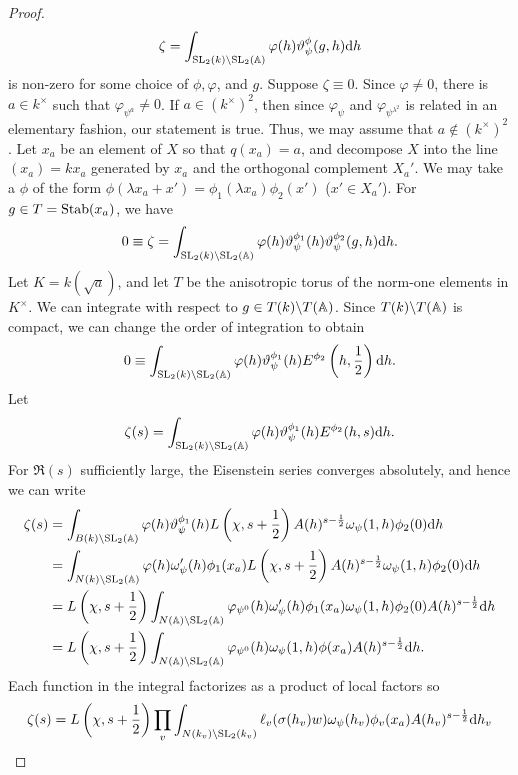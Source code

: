 \begin{proof}
\[
\zeta = \int_{\mathrm{SL}_2(k) \backslash \mathrm{SL}_2(\mathbb{A})} \varphi(h) \vartheta_\psi^\phi(g, h) \mathrm{d} h
\]
is non-zero for some choice of $\phi, \varphi$, and $g$.
Suppose $\zeta \equiv 0$.
Since $\varphi \neq 0$, there is $a \in k^\times$ such that $\varphi_{\psi^a} \neq 0$.
If $a \in (k^\times)^2$, then since $\varphi_{\psi}$ and $\varphi_{\psi^{\lambda^2}}$ is related in an elementary fashion, our statement is true.
Thus, we may assume that $a \not\in (k^\times)^2$.
Let $x_a$ be an element of $X$ so that $q(x_a) = a$, and decompose $X$ into the line $(x_a) = kx_a$ generated by $x_a$ and the orthogonal complement $X_a'$.
We may take a $\phi$ of the form $\phi(\lambda x_a + x') = \phi_1(\lambda x_a) \phi_2(x')$ ($x' \in X_a'$).
For $g \in T = \mathrm{Stab} (x_a)$, we have
\[
0 \equiv \zeta = \int_{\mathrm{SL}_2(k) \backslash \mathrm{SL}_2(\mathbb{A})} \varphi(h) \vartheta_\psi^{\phi_1}(h) \vartheta_{\psi}^{\phi_2}(g, h) \mathrm{d} h.
\]
Let $K = k(\sqrt{a})$, and let $T$ be the anisotropic torus of the norm-one elements in $K^\times$.
We can integrate with respect to $g\in T(k) \backslash T(\mathbb{A})$.
Since $T(k) \backslash T(\mathbb{A})$ is compact, we can change the order of integration to obtain
\[
0 \equiv \int_{\mathrm{SL}_2(k) \backslash \mathrm{SL}_2(\mathbb{A})} \varphi(h) \vartheta_\psi^{\phi_1}(h) E^{\phi_2}\left(h, \frac{1}{2}\right) \mathrm{d} h.
\]
Let
\[
\zeta(s) = \int_{\mathrm{SL}_2(k) \backslash \mathrm{SL}_2(\mathbb{A})} \varphi(h) \vartheta_\psi^{\phi_1}(h) E^{\phi_2}(h, s) \mathrm{d} h.
\]
For $\Re(s)$ sufficiently large, the Eisenstein series converges absolutely, and hence we can write
\begin{align*}
    \zeta(s) &= \int_{B(k) \backslash \mathrm{SL}_2(\mathbb{A})} \varphi(h) \vartheta_\psi^{\phi_1}(h) L\left(\chi, s + \frac{1}{2}\right) A(h)^{s - \frac{1}{2}} \omega_\psi(1, h) \phi_2(0) \mathrm{d} h \\
    &= \int_{N(k) \backslash \mathrm{SL}_2(\mathbb{A})} \varphi(h) \omega_\psi'(h) \phi_1(x_a) L\left(\chi, s + \frac{1}{2}\right)A(h)^{s - \frac{1}{2}} \omega_\psi(1, h) \phi_2(0) \mathrm{d} h \\
    &= L\left(\chi, s + \frac{1}{2}\right) \int_{N(\mathbb{A}) \backslash \mathrm{SL}_2(\mathbb{A})}\varphi_{\psi^{0}}(h) \omega_\psi'(h)\phi_1(x_a) \omega_\psi(1, h) \phi_2(0) A(h)^{s- \frac{1}{2}} \mathrm{d} h \\
    &= L \left(\chi, s + \frac{1}{2}\right) \int_{N(\mathbb{A}) \backslash \mathrm{SL}_2(\mathbb{A})} \varphi_{\psi^{0}}(h) \omega_\psi(1, h) \phi(x_a) A(h)^{s - \frac{1}{2}} \mathrm{d} h.
\end{align*}
Each function in the integral factorizes as a product of local factors so
\[
\zeta(s) = L\left(\chi, s + \frac{1}{2}\right) \prod_v \int_{N(k_v) \backslash \mathrm{SL}_2(k_v)} \ell_v(\sigma(h_v) w) \omega_\psi(h_v) \phi_v(x_a) A(h_v)^{s - \frac{1}{2}} \mathrm{d} h_v
\]
\end{proof}
